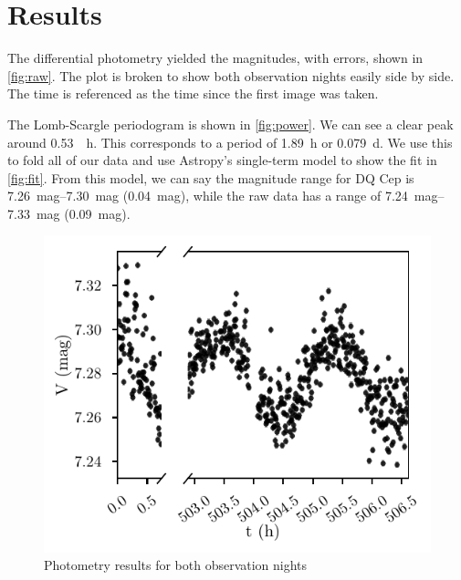 \documentclass[%
aip,
jmp,
reprint,
floatfix,
nofootinbib
]{revtex4-1}
\begin{document}
	
	\section{Results}
	
	The differential photometry yielded the magnitudes, with errors, shown in \autoref{fig:raw}. The plot is broken to show both observation nights easily side by side. The time is referenced as the time since the first image was taken. 
	
	The Lomb-Scargle periodogram is shown in \autoref{fig:power}. We can see a clear peak around \SI{0.53}{\per \hour}. This corresponds to a period of \SI{1.89}{\hour} or \SI{0.079}{\day}. We use this to fold all of our data and use Astropy's single-term model to show the fit in \autoref{fig:fit}. From this model, we can say the magnitude range for DQ Cep is \SIrange{7.26}{7.30}{mag} (\SI{.04}{mag}), while the raw data has a range of \SIrange{7.24}{7.33}{mag} (\SI{.09}{mag}).
	 \begin{figure}
	 	\centering
	 	\includegraphics[width=\linewidth]{figs/rawmags.pdf}
	 	\caption{Photometry results for both observation nights}
	 	\label{fig:raw}
	 \end{figure}
\end{document}
